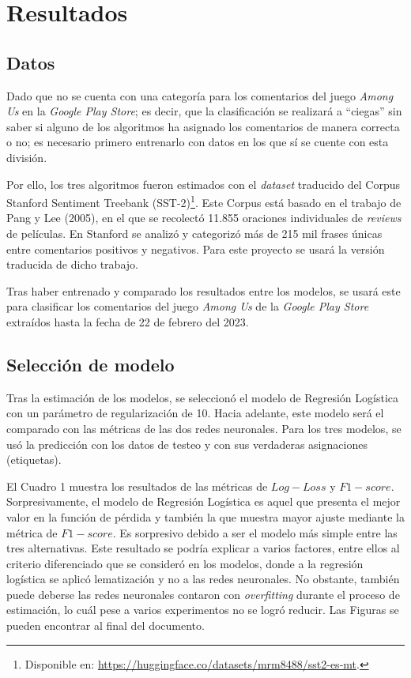 \section{Resultados}
\subsection{Datos}
Dado que no se cuenta con una categoría para los comentarios del juego \textit{Among Us} en la \textit{Google Play Store}; es decir, que la clasificación se realizará a “ciegas” sin saber si alguno de los algoritmos ha asignado los comentarios de manera correcta o no; es necesario primero entrenarlo con datos en los que sí se cuente con esta división.

Por ello, los tres algoritmos fueron estimados con el \textit{dataset} traducido del Corpus Stanford Sentiment Treebank (SST-2)\footnote{Disponible en: \url{https://huggingface.co/datasets/mrm8488/sst2-es-mt}.}. Este Corpus está basado en el trabajo de Pang y Lee (2005), en el que se recolectó 11.855 oraciones individuales de \textit{reviews} de películas. En Stanford se analizó y categorizó más de 215 mil frases únicas entre comentarios positivos y negativos. Para este proyecto se usará la versión traducida de dicho trabajo.

Tras haber entrenado y comparado los resultados entre los modelos, se usará este para clasificar los comentarios del juego \textit{Among Us} de la \textit{Google Play Store} extraídos hasta la fecha de 22 de febrero del 2023.

\subsection{Selección de modelo}
Tras la estimación de los modelos, se seleccionó el modelo de Regresión Logística con un parámetro de regularización de 10. Hacia adelante, este modelo será el comparado con las métricas de las dos redes neuronales. Para los tres modelos, se usó la predicción con los datos de testeo y con sus verdaderas asignaciones (etiquetas).

El Cuadro 1 muestra los resultados de las métricas de $Log-Loss$ y $F1-score$. Sorpresivamente, el modelo de Regresión Logística es aquel que presenta el mejor valor en la función de pérdida y también la que muestra mayor ajuste mediante la métrica de $F1-score$. Es sorpresivo debido a ser el modelo más simple entre las tres alternativas. Este resultado se podría explicar a varios factores, entre ellos al criterio diferenciado que se consideró en los modelos, donde a la regresión logística se aplicó lematización y no a las redes neuronales. No obstante, también puede deberse las redes neuronales contaron con \textit{overfitting} durante el proceso de estimación, lo cuál pese a varios experimentos no se logró reducir. Las Figuras se pueden encontrar al final del documento.

